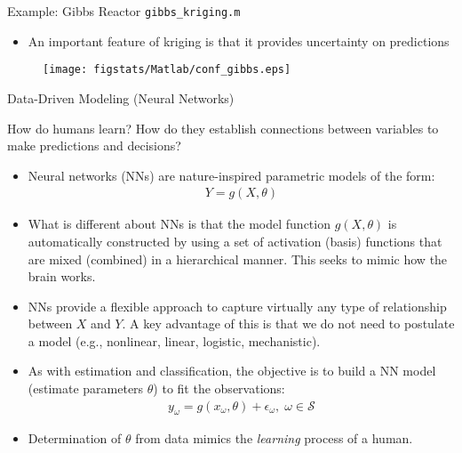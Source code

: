 \documentclass[handout,9pt]{beamer}
\begin{document}
%
\begin{frame}{Example: Gibbs Reactor \footnotesize{\texttt{gibbs\_kriging.m}}}

\begin{itemize}
\item An important feature of kriging is that it provides uncertainty on predictions
\end{itemize}

\begin{figure}[!htb]
    \centering
	\texttt{[image: figstats/Matlab/conf\_gibbs.eps]}
\end{figure}


\end{frame}

\begin{frame}{Data-Driven Modeling (Neural Networks)}

\begin{block}{}
How do humans learn? How do they establish connections between variables to make predictions and decisions? 
\end{block}

\begin{itemize}
   \setlength{\itemsep}{10pt}
\item Neural networks (NNs) are nature-inspired parametric models of the form:
\begin{align*}
Y=g(X,\theta)
\end{align*}
\item What is different about NNs is that the model function $g(X,\theta)$ is automatically constructed by using a set of activation (basis) functions that are mixed (combined) in a hierarchical manner.  This seeks to mimic how the brain works. 

\item NNs provide a flexible approach to capture virtually any type of relationship between $X$ and $Y$. A key advantage of this is that we do not need to postulate a model (e.g., nonlinear, linear, logistic, mechanistic).  

\item As with estimation and classification, the objective is to build a NN model (estimate parameters $\theta$) to fit the  observations:
\begin{align*}
y_\omega=g(x_\omega,\theta)+\epsilon_\omega,\; \omega \in \mathcal{S}
\end{align*}
\item Determination of $\theta$ from data mimics the {\em learning} process of a human. 

\end{itemize}

\end{frame}
\end{document}
